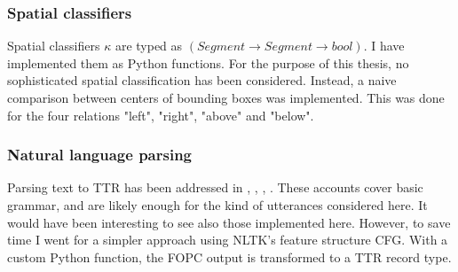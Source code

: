 \documentclass[11pt, a4paper]{article}
\begin{document}

\subsubsection{Spatial classifiers}

Spatial classifiers $\kappa$ are typed as $(Segment \rightarrow Segment \rightarrow bool)$.
I have implemented them as Python functions.
For the purpose of this thesis, no sophisticated spatial classification has been considered.
Instead, a naive comparison between centers of bounding boxes was implemented.
This was done for the four relations "left", "right", "above" and "below".



\subsubsection{Natural language parsing}

Parsing text to TTR has been addressed in \cite{CooperRecordsRecordTypes2005}, \cite{RobinCooperAustiniantruthattitudes2005}, \cite{CooperTypetheorysemantics2012}, \cite{CooperTypetheorylanguage2016}.
These accounts cover basic grammar, and are likely enough for the kind of utterances considered here.
It would have been interesting to see also those implemented here.
However, to save time I went for a simpler approach using NLTK's feature structure CFG.
With a custom Python function, the FOPC output is transformed to a TTR record type.
\end{document}
